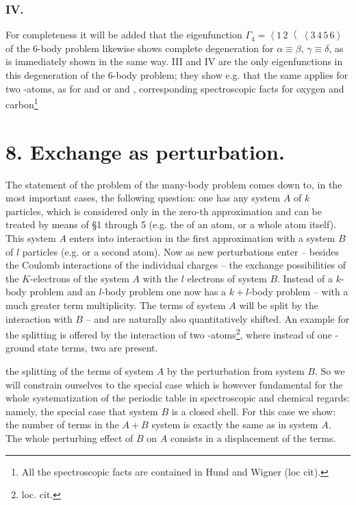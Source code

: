 \begin{paper}{1}
\subsubsection*{IV.} For completeness it will be added that the eigenfunction $\Gamma_4=\left<1\,2\right<\left<3\,4\,5\,6\right>$ of the 6-body problem likewise shows complete degeneration for $\alpha\equiv\beta$, $\gamma\equiv\delta$, as is immediately shown in the same way. III and IV are the only eigenfunctions in this degeneration of the 6-body problem; they show e.g. that the same applies for two -atoms, as for  and  or  and ,  corresponding spectroscopic facts for oxygen and carbon\footnote{All the spectroscopic facts are contained in Hund and Wigner (loc cit).}

\section*{8. Exchange as perturbation.} The statement of the problem of the many-body problem comes down to, in the most important cases, the following question: one has any system $A$ of $k$ particles, which is considered only in the zero-th approximation and can be treated by means of \S1 through 5 (e.g. the  of an atom, or a whole atom itself). This system $A$ enters into interaction in the first approximation with a system $B$ of $l$ particles (e.g.  or a second atom). Now as new perturbations enter -- besides the Coulomb interactions of the individual charges -- the exchange possibilities of the $K$-electrons of the system $A$ with the $l$ electrons of system $B$. Instead of a $k$-body problem and an $l$-body problem one now has a $k+l$-body problem -- with a much greater term multiplicity. The terms of system $A$ will be split by the interaction with $B$ -- and are naturally also quantitatively shifted. An example for the splitting is offered by the interaction of two -atoms\footnote{loc. cit.}, where instead of one -ground state terms, two are present.

 the splitting of the terms of system $A$ by the perturbation from system $B$. So we will constrain ourselves to the special case which is however fundamental for the whole systematization of the periodic table in spectroscopic and chemical regards: namely, the special case that system $B$ is a closed shell. For this case we show: the number of terms in the $A+B$ system is exactly the same as in system $A$. The whole perturbing effect of $B$ on $A$ consists in a displacement of the terms.


\end{paper}
